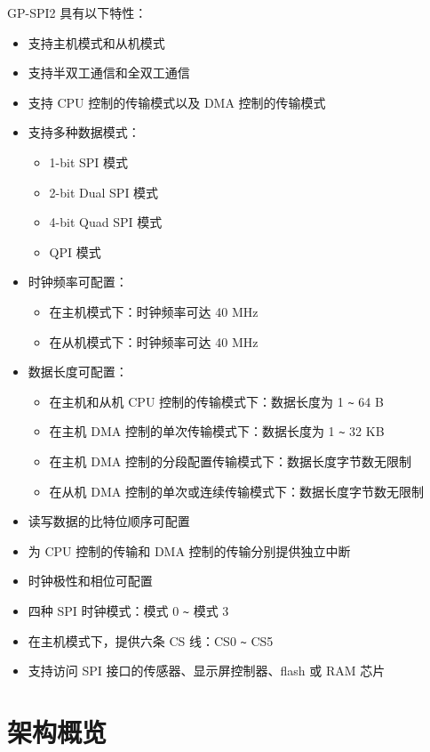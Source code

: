 \documentclass[main\_\_CN.tex]{subfiles}
\begin{document}
GP-SPI2 具有以下特性：
\begin{itemize}
    \item 支持主机模式和从机模式
    \item 支持半双工通信和全双工通信
    \item 支持 CPU 控制的传输模式以及 DMA 控制的传输模式
    \item 支持多种数据模式：
        \begin{itemize}
            \item 1-bit SPI 模式
            \item 2-bit Dual SPI 模式
            \item 4-bit Quad SPI 模式
            \item QPI 模式
        \end{itemize}
    \item 时钟频率可配置：
        \begin{itemize}
        \item 在主机模式下：时钟频率可达 40 MHz
            \item 在从机模式下：时钟频率可达 40 MHz
        \end{itemize}
    \item 数据长度可配置：
    \begin{itemize}
        \item 在主机和从机 CPU 控制的传输模式下：数据长度为 1 \verb+~+ 64 B
        \item 在主机 DMA 控制的单次传输模式下：数据长度为 1 \verb+~+ 32 KB
        \item 在主机 DMA 控制的分段配置传输模式下：数据长度字节数无限制
        \item 在从机 DMA 控制的单次或连续传输模式下：数据长度字节数无限制
    \end{itemize}
    \item 读写数据的比特位顺序可配置
    \item 为 CPU 控制的传输和 DMA 控制的传输分别提供独立中断
    \item 时钟极性和相位可配置
    \item 四种 SPI 时钟模式：模式 0 \verb+~+ 模式 3
    \item 在主机模式下，提供六条 CS 线：CS0 \verb+~+ CS5
    \item 支持访问 SPI 接口的传感器、显示屏控制器、flash 或 RAM 芯片
\end{itemize}

\section{架构概览}
\end{document}
